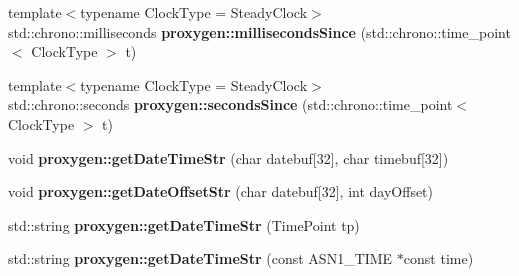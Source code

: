 \begin{DoxyCompactItemize}
\item 
{\footnotesize template$<$typename Clock\+Type  = Steady\+Clock$>$ }\\std\+::chrono\+::milliseconds {\bf proxygen\+::milliseconds\+Since} (std\+::chrono\+::time\+\_\+point$<$ Clock\+Type $>$ t)
\item 
{\footnotesize template$<$typename Clock\+Type  = Steady\+Clock$>$ }\\std\+::chrono\+::seconds {\bf proxygen\+::seconds\+Since} (std\+::chrono\+::time\+\_\+point$<$ Clock\+Type $>$ t)
\item 
void {\bf proxygen\+::get\+Date\+Time\+Str} (char datebuf[32], char timebuf[32])
\item 
void {\bf proxygen\+::get\+Date\+Offset\+Str} (char datebuf[32], int day\+Offset)
\item 
std\+::string {\bf proxygen\+::get\+Date\+Time\+Str} (Time\+Point tp)
\item 
std\+::string {\bf proxygen\+::get\+Date\+Time\+Str} (const A\+S\+N1\+\_\+\+T\+I\+ME $\ast$const time)
\end{DoxyCompactItemize}
